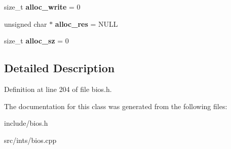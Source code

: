 \begin{DoxyCompactItemize}
\item 
\hypertarget{classISAPnPDevice_a0b6ff0bb3c342833d4eecf55b87e82ff}{size\-\_\-t {\bfseries alloc\-\_\-write} = 0}\label{classISAPnPDevice_a0b6ff0bb3c342833d4eecf55b87e82ff}

\item 
\hypertarget{classISAPnPDevice_ab7645d92be95729a5f745d0735342296}{unsigned char $\ast$ {\bfseries alloc\-\_\-res} = N\-U\-L\-L}\label{classISAPnPDevice_ab7645d92be95729a5f745d0735342296}

\item 
\hypertarget{classISAPnPDevice_ae872e27861732e57001057215332f53f}{size\-\_\-t {\bfseries alloc\-\_\-sz} = 0}\label{classISAPnPDevice_ae872e27861732e57001057215332f53f}

\end{DoxyCompactItemize}


\subsection{Detailed Description}


Definition at line 204 of file bios.\-h.



The documentation for this class was generated from the following files\-:\begin{DoxyCompactItemize}
\item 
include/bios.\-h\item 
src/ints/bios.\-cpp\end{DoxyCompactItemize}
